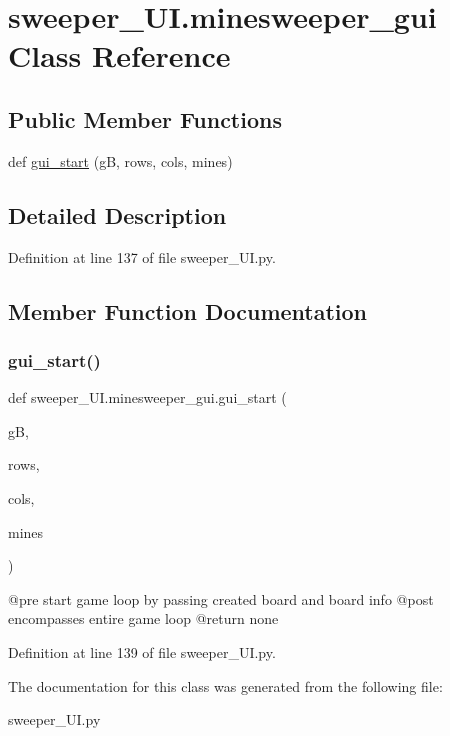 \hypertarget{classsweeper___u_i_1_1minesweeper__gui}{}\section{sweeper\+\_\+\+U\+I.\+minesweeper\+\_\+gui Class Reference}
\label{classsweeper___u_i_1_1minesweeper__gui}
\subsection*{Public Member Functions}
\begin{DoxyCompactItemize}
\item 
def \hyperlink{classsweeper___u_i_1_1minesweeper__gui_a9b40d50bb0783902917d33f0bbc14bf1}{gui\+\_\+start} (gB, rows, cols, mines)
\end{DoxyCompactItemize}


\subsection{Detailed Description}


Definition at line 137 of file sweeper\+\_\+\+U\+I.\+py.



\subsection{Member Function Documentation}
\mbox{\label{classsweeper___u_i_1_1minesweeper__gui_a9b40d50bb0783902917d33f0bbc14bf1}} 
\subsubsection{\texorpdfstring{gui\+\_\+start()}{gui\_start()}}
{\footnotesize\ttfamily def sweeper\+\_\+\+U\+I.\+minesweeper\+\_\+gui.\+gui\+\_\+start (\begin{DoxyParamCaption}\item[{}]{gB,  }\item[{}]{rows,  }\item[{}]{cols,  }\item[{}]{mines }\end{DoxyParamCaption})}

\begin{DoxyVerb}@pre start game loop by passing created board and board info
@post encompasses entire game loop
@return none
\end{DoxyVerb}
 

Definition at line 139 of file sweeper\+\_\+\+U\+I.\+py.



The documentation for this class was generated from the following file\+:\begin{DoxyCompactItemize}
\item 
sweeper\+\_\+\+U\+I.\+py\end{DoxyCompactItemize}
